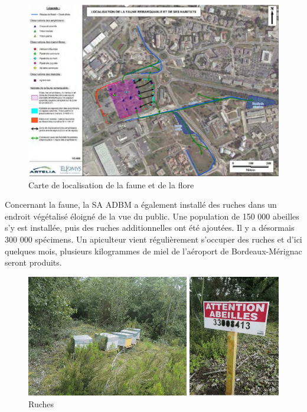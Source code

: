 \begin{figure}[hbt!]
  \centering
  \includegraphics[width=14cm]{Images/carteenvironnement.png}
  \caption{Carte de localisation de la faune et de la flore}
  \label{fig:crapeau}
\end{figure}

Concernant la faune, la SA ADBM a également installé des ruches dans un endroit végétalisé éloigné de la vue du public. Une population de 150 000 abeilles s'y est installée, puis des ruches additionnelles ont été ajoutées. Il y a désormais 300 000 spécimens. Un apiculteur vient régulièrement s'occuper des ruches et d'ici quelques mois, plusieurs kilogrammes de miel de l'aéroport de Bordeaux-Mérignac seront produits.

 \begin{figure}[hbt!]
   \centering
   \includegraphics[width=14cm]{Images/ruches.jpg}
   \caption{Ruches}
   \label{fig:abeilles}
 \end{figure}

